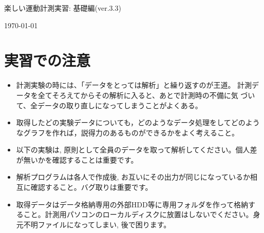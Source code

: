\documentclass{jsarticle}
\def\version{3.3}
\begin{document}
\begin{center}
  {\LARGE 楽しい運動計測実習: 基礎編(ver.\version)}
\end{center}
\begin{flushright}
\today
\end{flushright}

\section*{実習での注意}
\begin{itemize}
\item 計測実験の時には、「データをとっては解析」と繰り返すのが王道。
  計測データを全てそろえてからその解析に入ると、あとで計測時の不備に気
  づいて、全データの取り直しになってしまうことがよくある。
\item 取得したどの実験データについても，どのようなデータ処理をしてどのようなグラフを作れば，説得力のあるものができるかをよく考えること。
\item 以下の実験は, 原則として全員のデータを取って解析してください。個人差が無いかを確認することは重要です。
\item 解析プログラムは各人で作成後, お互いにその出力が同じになっているか相互に確認すること。バグ取りは重要です。
\item 取得データはデータ格納専用の外部HDD等に専用フォルダを作って格納す
  ること。計測用パソコンのローカルディスクに放置はしないでください。身元不明ファイルになってしまい, 後で困ります。
\end{itemize}

\end{document}
